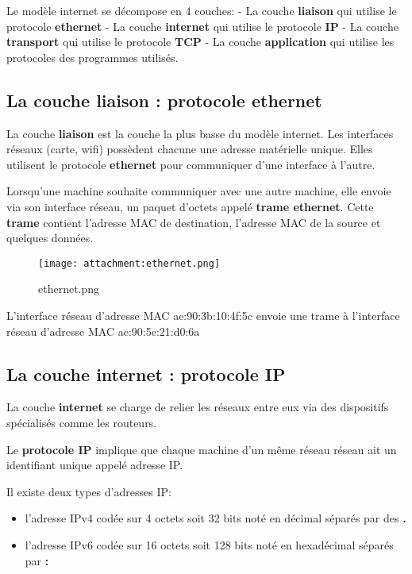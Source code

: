 \documentclass[11pt]{article}
\providecommand{\tightlist}{%
      \setlength{\itemsep}{0pt}\setlength{\parskip}{0pt}}
\begin{document}
Le modèle internet se décompose en 4 couches: - La couche
\textbf{liaison} qui utilise le protocole \textbf{ethernet} - La couche
\textbf{internet} qui utilise le protocole \textbf{IP} - La couche
\textbf{transport} qui utilise le protocole \textbf{TCP} - La couche
\textbf{application} qui utilise les protocoles des programmes utilisés.

    \hypertarget{la-couche-liaison-protocole-ethernet}{%
\subsection{La couche liaison : protocole
ethernet}\label{la-couche-liaison-protocole-ethernet}}

La couche \textbf{liaison} est la couche la plus basse du modèle
internet. Les interfaces réseaux (carte, wifi) possèdent chacune une
adresse matérielle unique. Elles utilisent le protocole
\textbf{ethernet} pour communiquer d'une interface à l'autre.

Lorsqu'une machine souhaite communiquer avec une autre machine, elle
envoie via son interface réseau, un paquet d'octets appelé \textbf{trame
ethernet}. Cette \textbf{trame} contient l'adresse MAC de destination,
l'adresse MAC de la source et quelques données.

    \begin{figure}
\centering
\texttt{[image: attachment:ethernet.png]}
\caption{ethernet.png}
\end{figure}

    L'interface réseau d'adresse MAC ae:90:3b:10:4f:5c envoie une trame à
l'interface réseau d'adresse MAC ae:90:5e:21:d0:6a

    \hypertarget{la-couche-internet-protocole-ip}{%
\subsection{La couche internet : protocole
IP}\label{la-couche-internet-protocole-ip}}

La couche \textbf{internet} se charge de relier les réseaux entre eux
via des dispositifs spécialisés comme les routeurs.

Le \textbf{protocole IP} implique que chaque machine d'un même réseau
réseau ait un identifiant unique appelé adresse IP.

Il existe deux types d'adresses IP:

\begin{itemize}
\tightlist
\item
  l'adresse IPv4 codée sur 4 octets soit 32 bits noté en décimal séparés
  par des \textbf{.}
\item
  l'adresse IPv6 codée sur 16 octets soit 128 bits noté en hexadécimal
  séparés par \textbf{:}
\end{itemize}
\end{document}
